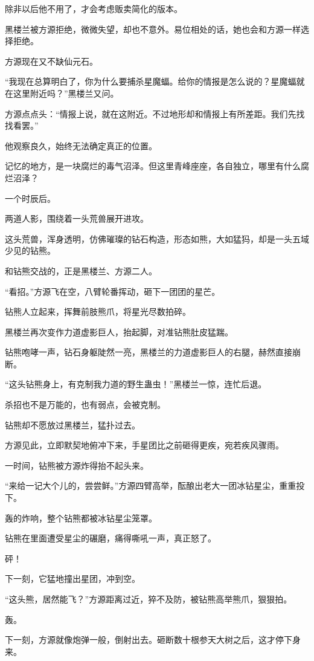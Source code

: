 \begin{this_body}
除非以后他不用了，才会考虑贩卖简化的版本。

黑楼兰被方源拒绝，微微失望，却也不意外。易位相处的话，她也会和方源一样选择拒绝。

方源现在又不缺仙元石。

“我现在总算明白了，你为什么要捕杀星魔蝠。给你的情报是怎么说的？星魔蝠就在这里附近吗？”黑楼兰又问。

方源点点头：“情报上说，就在这附近。不过地形却和情报上有所差距。我们先找找看罢。”

他观察良久，始终无法确定真正的位置。

记忆的地方，是一块腐烂的毒气沼泽。但这里青峰座座，各自独立，哪里有什么腐烂沼泽？

一个时辰后。

两道人影，围绕着一头荒兽展开进攻。

这头荒兽，浑身透明，仿佛璀璨的钻石构造，形态如熊，大如猛犸，却是一头五域少见的钻熊。

和钻熊交战的，正是黑楼兰、方源二人。

“看招。”方源飞在空，八臂轮番挥动，砸下一团团的星芒。

钻熊人立起来，挥舞前肢熊爪，将星光尽数拍碎。

黑楼兰再次变作力道虚影巨人，抬起脚，对准钻熊肚皮猛踹。

钻熊咆哮一声，钻石身躯陡然一亮，黑楼兰的力道虚影巨人的右腿，赫然直接崩断。

“这头钻熊身上，有克制我力道的野生蛊虫！”黑楼兰一惊，连忙后退。

杀招也不是万能的，也有弱点，会被克制。

钻熊却不愿放过黑楼兰，猛扑过去。

方源见此，立即默契地俯冲下来，手星团比之前砸得更疾，宛若疾风骤雨。

一时间，钻熊被方源炸得抬不起头来。

“来给一记大个儿的，尝尝鲜。”方源四臂高举，酝酿出老大一团冰钻星尘，重重投下。

轰的炸响，整个钻熊都被冰钻星尘笼罩。

钻熊在里面遭受星尘的碾磨，痛得嘶吼一声，真正怒了。

砰！

下一刻，它猛地撞出星团，冲到空。

“这头熊，居然能飞？”方源距离过近，猝不及防，被钻熊高举熊爪，狠狠拍。

轰。

下一刻，方源就像炮弹一般，倒射出去。砸断数十根参天大树之后，这才停下身来。


\end{this_body}
